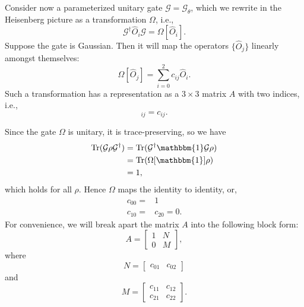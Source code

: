 \documentclass[aps,pra,10pt,twocolumn,groupedaddress,nofootinbib]{revtex4-1}
\theoremstyle{plain}
\begin{document}
Consider now a parameterized unitary gate $\mathcal{G}=\mathcal{G}_\theta$, which we rewrite in the Heisenberg picture as a transformation $\Omega$, i.e.,
\begin{equation}
 \mathcal{G}^\dagger \hat{O}_i \mathcal{G} = \Omega[\hat{O}_i].
\end{equation}
Suppose the gate is Gaussian. Then it will map the operators $\{\hat{O}_j\}$ linearly amongst themselves: 
\begin{equation}
 \Omega[\hat{O}_j] = \sum_{i=0}^2 c_{ij} \hat{O}_i.
\end{equation}
Such a transformation has a representation as a $3\times 3$ matrix $A$ with two indices, i.e., 
\begin{equation}
 [A]_{ij} = c_{ij}.
\end{equation}

Since the gate $\Omega$ is unitary, it is trace-preserving, so we have 
\begin{align}
 \mathrm{Tr}(\mathcal{G}\rho \mathcal{G}^\dagger) 
 & = \mathrm{Tr}(\mathcal{G}^\dagger\mathbbm{1}\mathcal{G}\rho ) \nonumber \\
 & = \mathrm{Tr}(\Omega[\mathbbm{1}]\rho ) \nonumber \\
 & = 1,
\end{align}
which holds for all $\rho$. Hence $\Omega$ maps the identity to identity, or,
\begin{align}
 c_{00} = & 1 \\
 c_{10} = & c_{20} = 0.
\end{align}
For convenience, we will break apart the matrix $A$ into the following block form:
\begin{equation}
 A = \left[
       \begin{array}{c|cc}
        1 & N \\
        \hline
        0 & M
       \end{array}
     \right],
\end{equation}
where
\begin{equation}
 N = \begin{bmatrix}
      c_{01} & c_{02}
     \end{bmatrix}
\end{equation}
and
\begin{equation}
 M = \begin{bmatrix}
      c_{11} & c_{12} \\
      c_{21} & c_{22}
     \end{bmatrix}.
\end{equation}
\end{document}
